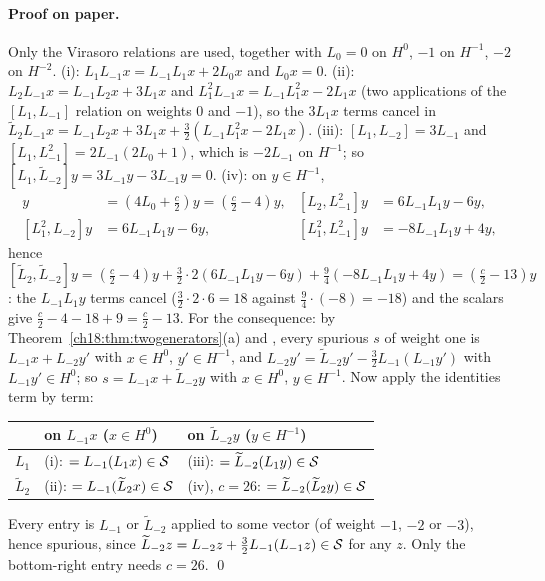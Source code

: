 \paragraph{Proof on paper.}  Only the Virasoro relations are used, together with $L_0=0$ on $H^0$,
$-1$ on $H^{-1}$, $-2$ on $H^{-2}$.  (i): $L_1L_{-1}x=L_{-1}L_1x+2L_0x$ and $L_0x=0$.  (ii):
$L_2L_{-1}x=L_{-1}L_2x+3L_1x$ and $L_1^2L_{-1}x=L_{-1}L_1^2x-2L_1x$ (two applications of the $[L_1,L_{-1}]$
relation on weights $0$ and $-1$), so the $3L_1x$ terms cancel in
$\widetilde L_2L_{-1}x=L_{-1}L_2x+3L_1x+\frac32(L_{-1}L_1^2x-2L_1x)$.  (iii): $[L_1,L_{-2}]=3L_{-1}$ and
$[L_1,L_{-1}^2]=2L_{-1}(2L_0+1)$, which is $-2L_{-1}$ on $H^{-1}$; so $[L_1,\widetilde L_{-2}]y=3L_{-1}y-3L_{-1}y=0$.
(iv): on $y\in H^{-1}$,
\begin{align*}
  [L_2,L_{-2}]y&=(4L_0+\tfrac c2)y=(\tfrac c2-4)y, &
  [L_2,L_{-1}^2]y&=6L_{-1}L_1y-6y,\\
  [L_1^2,L_{-2}]y&=6L_{-1}L_1y-6y, &
  [L_1^2,L_{-1}^2]y&=-8L_{-1}L_1y+4y,
\end{align*}
hence $[\widetilde L_2,\widetilde L_{-2}]y=(\frac c2-4)y+\frac32\cdot2(6L_{-1}L_1y-6y)+\frac94(-8L_{-1}L_1y+4y)
=(\frac c2-13)y$: the $L_{-1}L_1y$ terms cancel ($\frac32\cdot2\cdot6=18$ against $\frac94\cdot(-8)=-18$) and the scalars give
$\frac c2-4-18+9=\frac c2-13$.
For the consequence: by Theorem~\ref{ch18:thm:twogenerators}(a) and , every spurious $s$ of weight
one is $L_{-1}x+L_{-2}y'$ with $x\in H^0$, $y'\in H^{-1}$, and $L_{-2}y'=\widetilde L_{-2}y'-\frac32L_{-1}(L_{-1}y')$ with $L_{-1}y'\in H^0$;
so $s=L_{-1}x+\widetilde L_{-2}y$ with $x\in H^0$, $y\in H^{-1}$.  Now apply the identities term by term:
\begin{center}
\begin{tabular}{lll}
\toprule
 & on $L_{-1}x$ ($x\in H^0$) & on $\widetilde L_{-2}y$ ($y\in H^{-1}$)\\ \midrule
$L_1$ & (i): $=L_{-1}(L_1x)\in\mathcal{S}$ & (iii): $=\widetilde L_{-2}(L_1y)\in\mathcal{S}$\\
$\widetilde L_2$ & (ii): $=L_{-1}(\widetilde L_2x)\in\mathcal{S}$ & (iv), $c=26$: $=\widetilde L_{-2}(\widetilde L_2y)\in\mathcal{S}$\\
\bottomrule
\end{tabular}
\end{center}
Every entry is $L_{-1}$ or $\widetilde L_{-2}$ applied to some vector (of weight $-1$, $-2$ or $-3$), hence spurious, since
$\widetilde L_{-2}z=L_{-2}z+\frac32L_{-1}(L_{-1}z)\in\mathcal{S}$ for any $z$.  Only the bottom-right entry needs $c=26$. \qed

